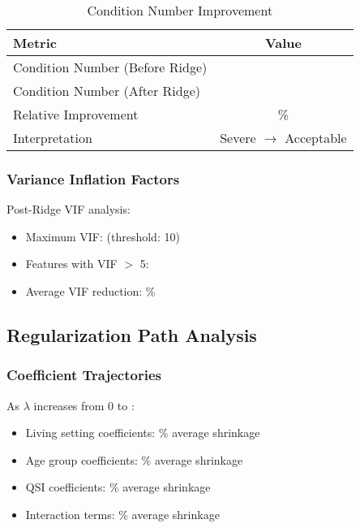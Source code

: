 \begin{table}[h]
\centering
\caption{Condition Number Improvement}
\begin{tabular}{lc}
\toprule
\textbf{Metric} & \textbf{Value} \\
\midrule
Condition Number (Before Ridge) & \ModelFiveConditionNumberBefore{} \\
Condition Number (After Ridge) & \ModelFiveConditionNumberAfter{} \\
Relative Improvement & \ModelFiveConditionImprovement{}\% \\
Interpretation & Severe $\rightarrow$ Acceptable \\
\bottomrule
\end{tabular}
\end{table}

\subsubsection{Variance Inflation Factors}

Post-Ridge VIF analysis:
\begin{itemize}
    \item Maximum VIF: \ModelFiveMaxVIFAfter{} (threshold: 10)
    \item Features with VIF $>$ 5: \ModelFiveHighVIFCount{}
    \item Average VIF reduction: \ModelFiveVIFReduction{}\%
\end{itemize}

\subsection{Regularization Path Analysis}

\subsubsection{Coefficient Trajectories}

As $\lambda$ increases from 0 to \ModelFiveAlpha{}:
\begin{itemize}
    \item Living setting coefficients: \ModelFiveLivingSettingShrinkage{}\% average shrinkage
    \item Age group coefficients: \ModelFiveAgeGroupShrinkage{}\% average shrinkage
    \item QSI coefficients: \ModelFiveQSIShrinkage{}\% average shrinkage
    \item Interaction terms: \ModelFiveInteractionShrinkage{}\% average shrinkage
\end{itemize}

